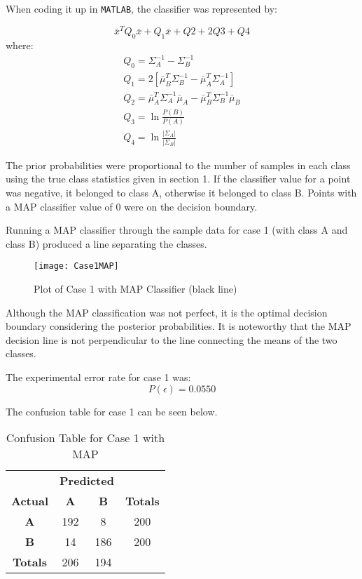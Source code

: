 \documentclass{article}
\begin{document}
When coding it up in \verb|MATLAB|, the classifier was represented by:

$$
\bar{x}^T Q_0 \bar{x} + Q_1\bar{x} + Q2 + 2Q3 + Q4
$$
where:
\begin{gather*}
Q_0 = \Sigma_A^{-1} - \Sigma_B^{-1} \\
Q_1 = 2[\bar{\mu}_B^T \Sigma_B^{-1} - \bar{\mu}_A^T \Sigma_A^{-1}] \\
Q_2 = \bar{\mu}_A^T \Sigma_A^{-1} \bar{\mu}_A - \bar{\mu}_B^T \Sigma_B^{-1} \bar{\mu}_B \\
Q_3 = \ln{\frac{P(B)}{P(A)}} \\
Q_4 = \ln{\frac{|\Sigma_A|}{|\Sigma_B|}}
\end{gather*}

The prior probabilities were proportional to the number of samples in each class using the true class statistics given in section 1. If the classifier value for a point was negative, it belonged to class A, otherwise it belonged to class B. Points with a MAP classifier value of 0 were on the decision boundary.

Running a MAP classifier through the sample data for case 1 (with class A and class B) produced a line separating the classes.

\begin{figure}[H]
\caption{Plot of Case 1 with MAP Classifier (black line)}
\centering
\texttt{[image: Case1MAP]}
\label{fig:Case1_MAP}
\end{figure}

Although the MAP classification was not perfect, it is the optimal decision boundary considering the posterior probabilities. It is noteworthy that the MAP decision line is not perpendicular to the line connecting the means of the two classes.

The experimental error rate for case 1 was:
$$
P(\epsilon) = 0.0550
$$

The confusion table for case 1 can be seen below.

\begin{table}[H]
    \centering
    \begin{tabular}{c|c c|c|}
        & \multicolumn{2}{c|}{\textbf{Predicted}} \\
        \textbf{Actual} & \textbf{A} & \textbf{B} & \textbf{Totals} \\
        \hline
        \textbf{A} & 192 \cellcolor[gray]{.8} & 8 & 200\\
        \textbf{B} & 14 & 186 \cellcolor[gray]{.8} & 200\\\hline
        \textbf{Totals} & 206 & 194\\
        \cline{1-3}
    \end{tabular}
    \caption{Confusion Table for Case 1 with MAP}
    \label{tab:Case1_MAP_error}
\end{table}
\end{document}
